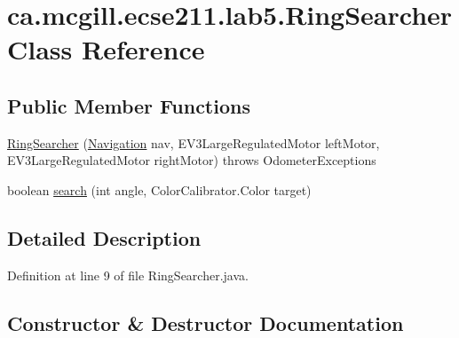 \hypertarget{classca_1_1mcgill_1_1ecse211_1_1lab5_1_1_ring_searcher}{}\section{ca.\+mcgill.\+ecse211.\+lab5.\+Ring\+Searcher Class Reference}
\label{classca_1_1mcgill_1_1ecse211_1_1lab5_1_1_ring_searcher}
\subsection*{Public Member Functions}
\begin{DoxyCompactItemize}
\item 
\hyperlink{classca_1_1mcgill_1_1ecse211_1_1lab5_1_1_ring_searcher_aa3f2d76984b3b80f32b6ddd6770e24b0}{Ring\+Searcher} (\hyperlink{classca_1_1mcgill_1_1ecse211_1_1lab5_1_1_navigation}{Navigation} nav, E\+V3\+Large\+Regulated\+Motor left\+Motor, E\+V3\+Large\+Regulated\+Motor right\+Motor)  throws Odometer\+Exceptions 
\item 
boolean \hyperlink{classca_1_1mcgill_1_1ecse211_1_1lab5_1_1_ring_searcher_a88a4c77f3c76d74edc8bfd0229f0902f}{search} (int angle, Color\+Calibrator.\+Color target)
\end{DoxyCompactItemize}


\subsection{Detailed Description}


Definition at line 9 of file Ring\+Searcher.\+java.



\subsection{Constructor \& Destructor Documentation}
\mbox{\label{classca_1_1mcgill_1_1ecse211_1_1lab5_1_1_ring_searcher_aa3f2d76984b3b80f32b6ddd6770e24b0}} 
